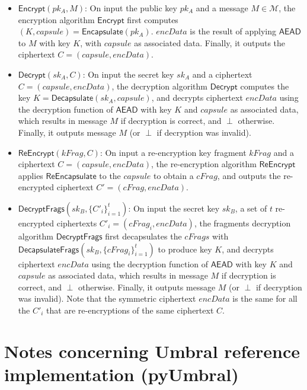 \documentclass{amsart}
\begin{document}
\begin{itemize}
	
	\item $\mathsf{Encrypt}(pk_A, M)$: On input the public key $pk_A$ and a message $M\in\mathcal{M}$, the encryption algorithm $\mathsf{Encrypt}$ first computes $(K, capsule) = \mathsf{Encapsulate}(pk_A)$. 
	$encData$ is the result of applying $\mathsf{AEAD}$ to $M$ with key $K$, with $capsule$ as associated data. 
	Finally, it outputs the ciphertext $C = (capsule, encData)$.
	
	\item $\mathsf{Decrypt}(sk_A, C)$: On input the secret key $sk_A$ and a ciphertext $C = (capsule, encData)$, the decryption algorithm $\mathsf{Decrypt}$ computes the key $K = \mathsf{Decapsulate}(sk_A, capsule)$, and decrypts ciphertext $encData$ using the decryption function of $\mathsf{AEAD}$ with key $K$ and $capsule$ as associated data, which results in message $M$ if decryption is correct, and $\perp$ otherwise. Finally, it outputs message $M$ (or $\perp$ if decryption was invalid).
	
	\item $\mathsf{ReEncrypt}(kFrag, C)$: On input a re-encryption key fragment $kFrag$ and a ciphertext $C = (capsule, encData)$, the re-encryption algorithm $\mathsf{ReEncrypt}$ applies $\mathsf{ReEncapsulate}$ to the $capsule$ to obtain a $cFrag$, and outputs the re-encrypted ciphertext $C' = (cFrag, encData)$.
	
	\item $\mathsf{DecryptFrags}(sk_B, \{C'_i\}_{i=1}^t)$: On input the secret key $sk_B$, a set of $t$ re-encrypted ciphertexts $C'_i = (cFrag_i, encData)$, the fragments decryption algorithm $\mathsf{DecryptFrags}$ first decapsulates the $cFrags$ with $\mathsf{DecapsulateFrags}(sk_B, \{cFrag_i\}_{i=1}^t)$ to produce key $K$, and decrypts ciphertext $encData$ using the decryption function of $\mathsf{AEAD}$ with key $K$ and $capsule$ as associated data, which results in message $M$ if decryption is correct, and $\perp$ otherwise. Finally, it outputs message $M$ (or $\perp$ if decryption was invalid).	Note that the symmetric ciphertext $encData$ is the same for all the $C'_i$ that are re-encryptions of the same ciphertext $C$. 
	
\end{itemize}
	


\section{Notes concerning Umbral reference implementation (\textsf{pyUmbral})}
\end{document}
